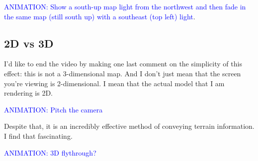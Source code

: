 \documentclass{article}
\newcommand\animation[1]{\textcolor{blue}{ANIMATION: #1}}
\begin{document}
\animation{Show a south-up map light from the northwest and then fade in the same map (still south up) with a southeast (top left) light}.

\subsection{2D vs 3D}

I'd like to end the video by making one last comment on the simplicity of this effect: this is not a 3-dimensional map.
And I don't just mean that the screen you're viewing is 2-dimensional.
I mean that the actual model that I am rendering is 2D.

\animation{Pitch the camera}

Despite that, it is an incredibly effective method of conveying terrain information.
I find that fascinating.

\animation{3D flythrough?}
\end{document}
